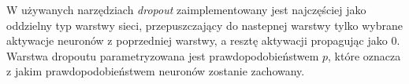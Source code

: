 W używanych narzędziach \textit{dropout} zaimplementowany jest najczęściej jako oddzielny typ warstwy sieci, przepuszczający do nastepnej warstwy tylko wybrane aktywacje neuronów z poprzedniej warstwy, a resztę aktywacji propagując jako 0. Warstwa dropoutu parametryzowana jest prawdopodobieństwem $p$, które oznacza z jakim prawdopodobieństwem neuronów zostanie zachowany.
